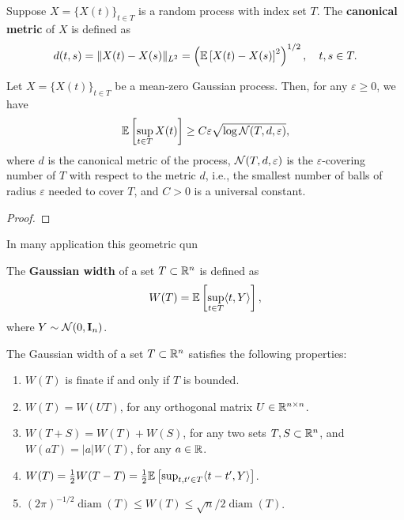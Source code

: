 \begin{definition}
    Suppose \(X=\{X(t)\}_{t\in T}\) is a random process with index set \(T\). The \textbf{canonical metric} of \(X\) is defined as
    \begin{equation}
        d(t,s)=\|X(t)-X(s)\|_{L^{2}}=\left({\mathbb E}\left[X(t)-X(s)\right]^{2}\right)^{1/2},\quad t,s\in T.
    \end{equation}
\end{definition}

\begin{theorem}
    Let \(X=\{X(t)\}_{t\in T}\) be a mean-zero Gaussian process. Then, for any \(\varepsilon\geq 0\), we have
    \begin{equation*}
        {\mathbb E}\left[\sup_{t\in T}X(t)\right]\geq C\varepsilon\sqrt{\log {\mathcal N}(T,d,\varepsilon)},
    \end{equation*}
    where \(d\) is the canonical metric of the process, \({\mathcal N}(T,d,\varepsilon)\) is the \(\varepsilon\)-covering number of \(T\) with respect to the metric \(d\), i.e., the smallest number of balls of radius \(\varepsilon\) needed to cover \(T\), and \(C>0\) is a universal constant.
\end{theorem}

\begin{proof}
    
\end{proof}

In many application this geometric qun

\begin{definition}
    The \textbf{Gaussian width} of a set \(T\subset{\mathbb R}^{n}\) is defined as
    \begin{equation}
        W(T)={\mathbb E}\left[\sup_{t\in T}\langle t,Y\rangle\right],
    \end{equation}
    where \(Y\sim{\mathcal N}(0,{\bf I}_{n})\).
\end{definition}

\begin{proposition}
    The Gaussian width of a set \(T\subset{\mathbb R}^{n}\) satisfies the following properties:
    \begin{enumerate}
        \item \(W(T)\) is finate if and only if \(T\) is bounded.
        \item \(W(T)=W(UT)\), for any orthogonal matrix \(U\in{\mathbb R}^{n\times n}\).
        \item \(W(T+S)=W(T)+W(S)\), for any two sets \(T,S\subset{\mathbb R}^{n}\), and \(W(aT)=|a|W(T)\), for any \(a\in{\mathbb R}\).
        \item \(W(T)=\frac{1}{2}W(T-T)=\frac{1}{2}{\mathbb E}\left[\sup_{t,t'\in T}\langle t-t',Y\rangle\right]\).
        \item \((2\pi)^{-1/2}\operatorname{diam}(T)\leq W(T)\leq\sqrt{n}/2\operatorname{diam}(T)\).
    \end{enumerate}
\end{proposition}

